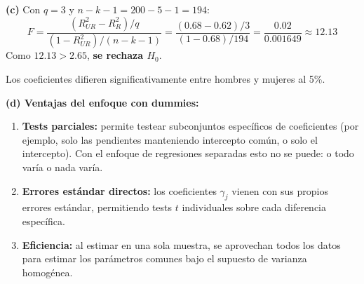 \documentclass[11pt,a4paper]{article}
\begin{document}
\begin{enumerate}
\textbf{(c)} Con $q=3$ y $n-k-1 = 200-5-1 = 194$:
\[
F = \frac{(R^2_{UR}-R^2_R)/q}{(1-R^2_{UR})/(n-k-1)} = \frac{(0.68-0.62)/3}{(1-0.68)/194} = \frac{0.02}{0.001649} \approx 12.13
\]
Como $12.13 > 2.65$, \textbf{se rechaza $H_0$}.

\begin{conclusion}
Los coeficientes difieren significativamente entre hombres y mujeres al 5\%.
\end{conclusion}

\textbf{(d) Ventajas del enfoque con dummies:}
\begin{enumerate}[leftmargin=2em]
    \item \textbf{Tests parciales:} permite testear subconjuntos específicos de coeficientes (por ejemplo, solo las pendientes manteniendo intercepto común, o solo el intercepto). Con el enfoque de regresiones separadas esto no se puede: o todo varía o nada varía.
    \item \textbf{Errores estándar directos:} los coeficientes $\gamma_j$ vienen con sus propios errores estándar, permitiendo tests $t$ individuales sobre cada diferencia específica.
    \item \textbf{Eficiencia:} al estimar en una sola muestra, se aprovechan todos los datos para estimar los parámetros comunes bajo el supuesto de varianza homogénea.
\end{enumerate}

\end{enumerate}
\end{document}
